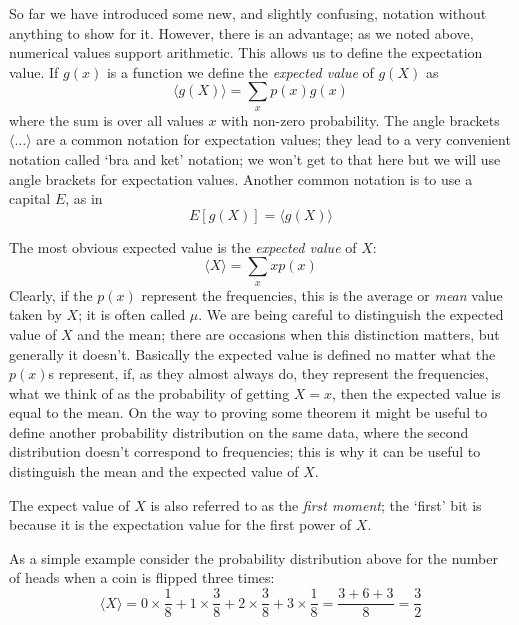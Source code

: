 \documentclass[11pt,a4paper]{scrartcl}
\begin{document}
So far we have introduced some new, and slightly confusing, notation
without anything to show for it. However, there is an advantage; as we
noted above, numerical values support arithmetic. This allows us to
define the expectation value. If $g(x)$ is a function we define the
\textsl{expected value} of $g(X)$ as
\begin{equation}
\langle g(X)\rangle = \sum_x p(x)g(x)
\end{equation}
where the sum is over all values $x$ with non-zero probability. The
angle brackets $\langle \ldots \rangle$ are a common notation for
expectation values; they lead to a very convenient notation called
\lq{}bra and ket\rq{} notation; we won't get to that here but we will
use angle brackets for expectation values. Another common notation is to use a capital $E$, as in
\begin{equation}
E[g(X)]=\langle g(X)\rangle
\end{equation}

The most obvious expected value is the \textsl{expected value} of $X$:
\begin{equation}
\langle X \rangle =  \sum_x x p(x)
\end{equation}
Clearly, if the $p(x)$ represent the frequencies, this is the average
or \textsl{mean} value taken by $X$; it is often called $\mu$. We are
being careful to distinguish the expected value of $X$ and the mean;
there are occasions when this distinction matters, but generally it
doesn't. Basically the expected value is defined no matter what the
$p(x)$s represent, if, as they almost always do, they represent the
frequencies, what we think of as the probability of getting $X=x$,
then the expected value is equal to the mean. On the way to proving
some theorem it might be useful to define another probability
distribution on the same data, where the second distribution doesn't
correspond to frequencies; this is why it can be useful to distinguish
the mean and the expected value of $X$.

The expect value of $X$ is also referred to as the \textsl{first
  moment}; the \lq{}first\rq{} bit is because it is the expectation
value for the first power of $X$.

As a simple example consider the probability distribution above for
the number of heads when a coin is flipped three times:
\begin{equation}
\langle X\rangle =0\times\frac{1}{8}+1\times\frac{3}{8}+2\times\frac{3}{8}+3\times \frac{1}{8}=\frac{3+6+3}{8}=\frac{3}{2}
\end{equation}
\end{document}
